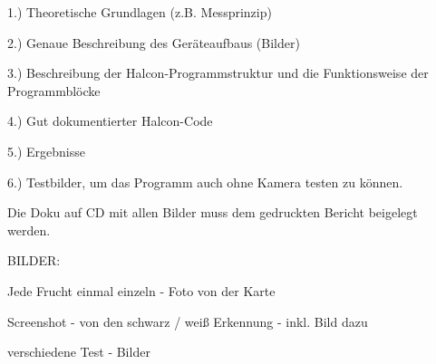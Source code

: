 






1.) Theoretische Grundlagen (z.B. Messprinzip)

2.) Genaue Beschreibung des Geräteaufbaus (Bilder)

3.) Beschreibung der Halcon-Programmstruktur und die Funktionsweise der Programmblöcke

4.) Gut dokumentierter Halcon-Code 

5.) Ergebnisse 

6.) Testbilder, um das Programm auch ohne Kamera testen zu können.

Die Doku auf CD mit allen Bilder muss dem gedruckten Bericht beigelegt werden.

BILDER:

Jede Frucht einmal einzeln - Foto von der Karte

Screenshot - von den schwarz / weiß Erkennung - inkl. Bild dazu 

verschiedene Test - Bilder
